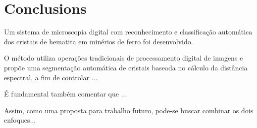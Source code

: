 
\chapter{Conclusions}

Um sistema de microscopia digital com reconhecimento e classificação
automática dos cristais de hematita em minérios de ferro foi
desenvolvido.

O método utiliza operações tradicionais de processamento digital de
imagens e propõe uma segmentação automática de cristais baseada no
cálculo da distância espectral, a fim de controlar ...

É fundamental também comentar que ...

Assim, como uma proposta para trabalho futuro, pode-se buscar combinar
os dois enfoques...
